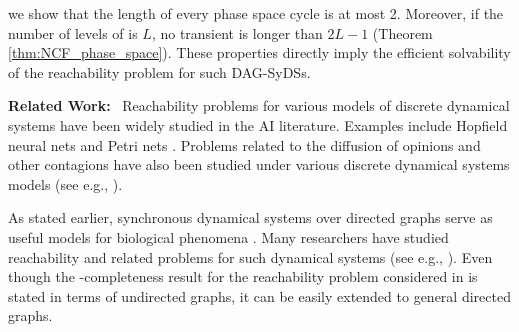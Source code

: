  we show
that the length of every phase space cycle is at most 2.
Moreover, if the number of levels of  \cals{} is $L$,
no transient is longer than $2L-1$
(Theorem \ref{thm:NCF_phase_space}).
These properties
directly imply the efficient solvability of the reachability
problem for such DAG-SyDSs.
\fi

\smallskip

\noindent
\textbf{Related Work:}~ Reachability problems for various
models of discrete dynamical systems have been widely studied
in the AI literature.
Examples include 
Hopfield neural nets \cite{FO-1989,Orponen-1993,Orponen-1994}
and Petri nets \cite{Esparza-etal-1994}.
Problems related to the diffusion of opinions and other contagions have
also been studied under various discrete dynamical systems
models (see e.g., 
\cite{Auletta-etal-2018,Botan-etal-2019,Chistikov-etal-2020,BE-2017}).

As stated earlier, synchronous dynamical systems over 
directed graphs serve as useful models for biological
phenomena \cite{Kauffman-etal-2003}.
Many researchers have studied reachability and related 
problems for such dynamical systems (see e.g., 
\cite{OU-2020,OU-2017}). 
Even though the \cpsp-completeness result for the reachability problem 
considered in \cite{Rosenkrantz-etal-2018} is stated in terms of undirected
graphs, it can be easily extended to general directed graphs.

